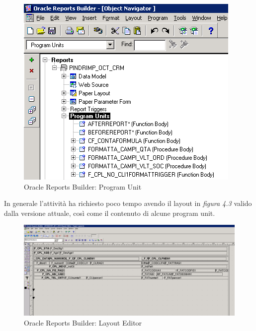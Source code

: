 \begin{figure}[!h]
\thispagestyle{empty}
\centering
\includegraphics[scale=0.85]{img/RepPU.png}
\caption{Oracle Reports Builder: Program Unit}
\end{figure}
In generale l'attività ha richiesto poco tempo avendo il layout in \textit{figura 4.3} valido dalla versione attuale, così come il contenuto di alcune program unit.
\begin{figure}[!h]
\thispagestyle{empty}
\centering
\includegraphics[scale=0.35]{img/ReportDIA.png}
\caption{Oracle Reports Builder: Layout Editor}
\end{figure}